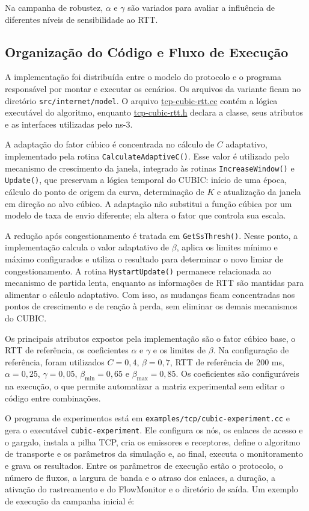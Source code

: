\documentclass[a4paper,12pt]{monografia}
\begin{document}
Na campanha de robustez, $\alpha$ e $\gamma$ são variados para avaliar a influência de diferentes níveis de sensibilidade ao RTT.

\subsection{Organização do Código e Fluxo de Execução}

A implementação foi distribuída entre o modelo do protocolo e o programa responsável por montar e executar os cenários. Os arquivos da variante ficam no diretório \texttt{src/internet/model}. O arquivo \url{tcp-cubic-rtt.cc} contém a lógica executável do algoritmo, enquanto \url{tcp-cubic-rtt.h} declara a classe, seus atributos e as interfaces utilizadas pelo ns-3.

A adaptação do fator cúbico é concentrada no cálculo de $C$ adaptativo, implementado pela rotina \texttt{CalculateAdaptiveC()}. Esse valor é utilizado pelo mecanismo de crescimento da janela, integrado às rotinas \texttt{IncreaseWindow()} e \texttt{Update()}, que preservam a lógica temporal do CUBIC: início de uma época, cálculo do ponto de origem da curva, determinação de $K$ e atualização da janela em direção ao alvo cúbico. A adaptação não substitui a função cúbica por um modelo de taxa de envio diferente; ela altera o fator que controla sua escala.

A redução após congestionamento é tratada em \texttt{GetSsThresh()}. Nesse ponto, a implementação calcula o valor adaptativo de $\beta$, aplica os limites mínimo e máximo configurados e utiliza o resultado para determinar o novo limiar de congestionamento. A rotina \texttt{HystartUpdate()} permanece relacionada ao mecanismo de partida lenta, enquanto as informações de RTT são mantidas para alimentar o cálculo adaptativo. Com isso, as mudanças ficam concentradas nos pontos de crescimento e de reação à perda, sem eliminar os demais mecanismos do CUBIC.

Os principais atributos expostos pela implementação são o fator cúbico base, o RTT de referência, os coeficientes $\alpha$ e $\gamma$ e os limites de $\beta$. Na configuração de referência, foram utilizados $C=0{,}4$, $\beta=0{,}7$, RTT de referência de 200 ms, $\alpha=0{,}25$, $\gamma=0{,}05$, $\beta_{\min}=0{,}65$ e $\beta_{\max}=0{,}85$. Os coeficientes são configuráveis na execução, o que permite automatizar a matriz experimental sem editar o código entre combinações.

O programa de experimentos está em \texttt{examples/tcp/cubic-experiment.cc} e gera o executável \texttt{cubic-experiment}. Ele configura os nós, os enlaces de acesso e o gargalo, instala a pilha TCP, cria os emissores e receptores, define o algoritmo de transporte e os parâmetros da simulação e, ao final, executa o monitoramento e grava os resultados. Entre os parâmetros de execução estão o protocolo, o número de fluxos, a largura de banda e o atraso dos enlaces, a duração, a ativação do rastreamento e do FlowMonitor e o diretório de saída. Um exemplo de execução da campanha inicial é:
\end{document}
